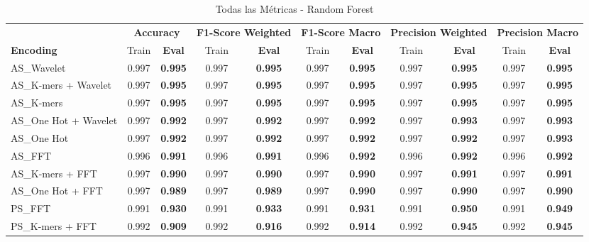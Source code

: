 \begin{table*}[htbp]
\centering
\caption{Todas las Métricas - Random Forest}
\label{tab:random_forest_complete}
\scriptsize
\begin{tabular}{lcccccccccc}
\toprule
& \multicolumn{2}{c}{\textbf{Accuracy}} & \multicolumn{2}{c}{\textbf{F1-Score Weighted}} & \multicolumn{2}{c}{\textbf{F1-Score Macro}} & \multicolumn{2}{c}{\textbf{Precision Weighted}} & \multicolumn{2}{c}{\textbf{Precision Macro}} \\
\cmidrule(lr){2-3} \cmidrule(lr){4-5} \cmidrule(lr){6-7} \cmidrule(lr){8-9} \cmidrule(lr){10-11}
\textbf{Encoding} & Train & \textbf{Eval} & Train & \textbf{Eval} & Train & \textbf{Eval} & Train & \textbf{Eval} & Train & \textbf{Eval} \\
\midrule
AS\_Wavelet & 0.997 & \textbf{0.995} & 0.997 & \textbf{0.995} & 0.997 & \textbf{0.995} & 0.997 & \textbf{0.995} & 0.997 & \textbf{0.995} \\
AS\_K-mers + Wavelet & 0.997 & \textbf{0.995} & 0.997 & \textbf{0.995} & 0.997 & \textbf{0.995} & 0.997 & \textbf{0.995} & 0.997 & \textbf{0.995} \\
AS\_K-mers & 0.997 & \textbf{0.995} & 0.997 & \textbf{0.995} & 0.997 & \textbf{0.995} & 0.997 & \textbf{0.995} & 0.997 & \textbf{0.995} \\
AS\_One Hot + Wavelet & 0.997 & \textbf{0.992} & 0.997 & \textbf{0.992} & 0.997 & \textbf{0.992} & 0.997 & \textbf{0.993} & 0.997 & \textbf{0.993} \\
AS\_One Hot & 0.997 & \textbf{0.992} & 0.997 & \textbf{0.992} & 0.997 & \textbf{0.992} & 0.997 & \textbf{0.992} & 0.997 & \textbf{0.993} \\
AS\_FFT & 0.996 & \textbf{0.991} & 0.996 & \textbf{0.991} & 0.996 & \textbf{0.992} & 0.996 & \textbf{0.992} & 0.996 & \textbf{0.992} \\
AS\_K-mers + FFT & 0.997 & \textbf{0.990} & 0.997 & \textbf{0.990} & 0.997 & \textbf{0.990} & 0.997 & \textbf{0.991} & 0.997 & \textbf{0.991} \\
AS\_One Hot + FFT & 0.997 & \textbf{0.989} & 0.997 & \textbf{0.989} & 0.997 & \textbf{0.990} & 0.997 & \textbf{0.990} & 0.997 & \textbf{0.990} \\
PS\_FFT & 0.991 & \textbf{0.930} & 0.991 & \textbf{0.933} & 0.991 & \textbf{0.931} & 0.991 & \textbf{0.950} & 0.991 & \textbf{0.949} \\
PS\_K-mers + FFT & 0.992 & \textbf{0.909} & 0.992 & \textbf{0.916} & 0.992 & \textbf{0.914} & 0.992 & \textbf{0.945} & 0.992 & \textbf{0.945} \\

\end{tabular}
\end{table*}
